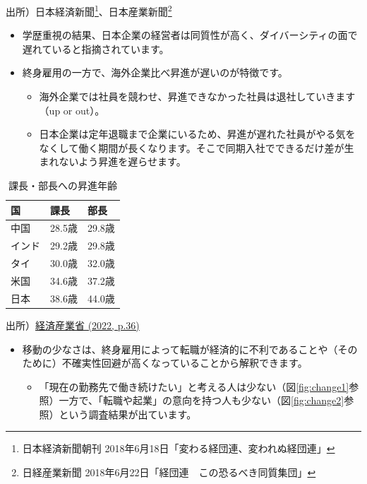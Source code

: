 \documentclass[
]{book}
\providecommand{\tightlist}{%
  \setlength{\itemsep}{0pt}\setlength{\parskip}{0pt}}
\begin{document}
出所）日本経済新聞\footnote{日本経済新聞朝刊 2018年6月18日「変わる経団連、変われぬ経団連」}、日本産業新聞\footnote{日経産業新聞 2018年6月22日「経団連　この恐るべき同質集団」}

\begin{itemize}
\item
  学歴重視の結果、日本企業の経営者は同質性が高く、ダイバーシティの面で遅れていると指摘されています。
\item
  終身雇用の一方で、海外企業比べ昇進が遅いのが特徴です。

  \begin{itemize}
  \item
    海外企業では社員を競わせ、昇進できなかった社員は退社していきます（up or out）。
  \item
    日本企業は定年退職まで企業にいるため、昇進が遅れた社員がやる気をなくして働く期間が長くなります。そこで同期入社でできるだけ差が生まれないよう昇進を遅らせます。
  \end{itemize}
\end{itemize}

\begin{table}

\caption{\label{tab:promotion}課長・部長への昇進年齢}
\centering
\begin{tabular}[t]{l|l|l}
\hline
国 & 課長 & 部長\\
\hline
中国 & 28.5歳 & 29.8歳\\
\hline
インド & 29.2歳 & 29.8歳\\
\hline
タイ & 30.0歳 & 32.0歳\\
\hline
米国 & 34.6歳 & 37.2歳\\
\hline
日本 & 38.6歳 & 44.0歳\\
\hline
\end{tabular}
\end{table}

出所）\href{https://www.meti.go.jp/press/2022/05/20220531001/20220531001-1.pdf}{経済産業省 (2022, p.36)}

\begin{itemize}
\item
  移動の少なさは、終身雇用によって転職が経済的に不利であることや（そのために）不確実性回避が高くなっていることから解釈できます。

  \begin{itemize}
  \tightlist
  \item
    「現在の勤務先で働き続けたい」と考える人は少ない（図\ref{fig:change1}参照）一方で、「転職や起業」の意向を持つ人も少ない（図\ref{fig:change2}参照）という調査結果が出ています。
  \end{itemize}
\end{itemize}
\end{document}
